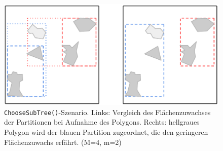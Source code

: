 \documentclass[runningheads,a4paper]{llncs}
\begin{document}
	\begin{figure}[H]
		\begin{center}
		\includegraphics[width=1.0\textwidth ]{002_Beispiel_Choose_SubTree.pdf}
		\caption{\texttt{ChooseSubTree()}-Szenario. Links: Vergleich des Flächenzuwachses der Partitionen bei Aufnahme des Polygons. Rechts: hellgraues Polygon wird der blauen Partition zugeordnet, die den geringeren Flächenzuwachs erfährt. (\acs{M}=4, \acs{m}=2)}
		\label{fig:beispiel-choose-subtree}
		\end{center}
	\end{figure}
\end{document}
